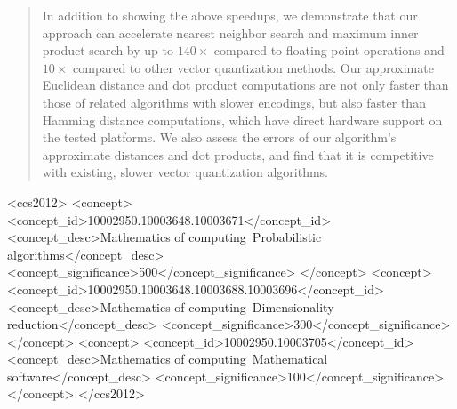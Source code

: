 \documentclass[sigconf]{acmart}  %
\begin{document}
\begin{abstract}
In addition to showing the above speedups, we demonstrate that our approach can accelerate nearest neighbor search and maximum inner product search by up to $140\times$ compared to floating point operations and $10\times$ compared to other vector quantization methods. Our approximate Euclidean distance and dot product computations are not only faster than those of related algorithms with slower encodings, but also faster than Hamming distance computations, which have direct hardware support on the tested platforms. We also assess the errors of our algorithm's approximate distances and dot products, and find that it is competitive with existing, slower vector quantization algorithms. %


\end{abstract}



\begin{CCSXML}
<ccs2012>
<concept>
<concept_id>10002950.10003648.10003671</concept_id>
<concept_desc>Mathematics of computing~Probabilistic algorithms</concept_desc>
<concept_significance>500</concept_significance>
</concept>
<concept>
<concept_id>10002950.10003648.10003688.10003696</concept_id>
<concept_desc>Mathematics of computing~Dimensionality reduction</concept_desc>
<concept_significance>300</concept_significance>
</concept>
<concept>
<concept_id>10002950.10003705</concept_id>
<concept_desc>Mathematics of computing~Mathematical software</concept_desc>
<concept_significance>100</concept_significance>
</concept>
</ccs2012>
\end{CCSXML}


\end{document}
